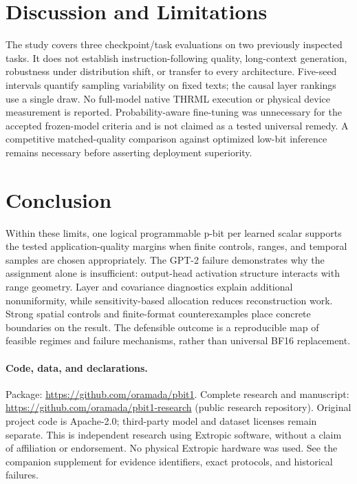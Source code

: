 \documentclass[11pt]{article}
\begin{document}
\section{Discussion and Limitations}
The study covers three checkpoint/task evaluations on two previously inspected tasks. It does not establish instruction-following quality, long-context generation, robustness under distribution shift, or transfer to every architecture. Five-seed intervals quantify sampling variability on fixed texts; the causal layer rankings use a single draw. No full-model native THRML execution or physical device measurement is reported. Probability-aware fine-tuning was unnecessary for the accepted frozen-model criteria and is not claimed as a tested universal remedy. A competitive matched-quality comparison against optimized low-bit inference remains necessary before asserting deployment superiority.

\section{Conclusion}
Within these limits, one logical programmable p-bit per learned scalar supports the tested application-quality margins when finite controls, ranges, and temporal samples are chosen appropriately. The GPT-2 failure demonstrates why the assignment alone is insufficient: output-head activation structure interacts with range geometry. Layer and covariance diagnostics explain additional nonuniformity, while sensitivity-based allocation reduces reconstruction work. Strong spatial controls and finite-format counterexamples place concrete boundaries on the result. The defensible outcome is a reproducible map of feasible regimes and failure mechanisms, rather than universal BF16 replacement.

\paragraph{Code, data, and declarations.}
Package: \url{https://github.com/oramada/pbit1}. Complete research and manuscript: \url{https://github.com/oramada/pbit1-research} (public research repository). Original project code is Apache-2.0; third-party model and dataset licenses remain separate. This is independent research using Extropic software, without a claim of affiliation or endorsement. No physical Extropic hardware was used. See the companion supplement for evidence identifiers, exact protocols, and historical failures.

{\raggedright


}
\end{document}
